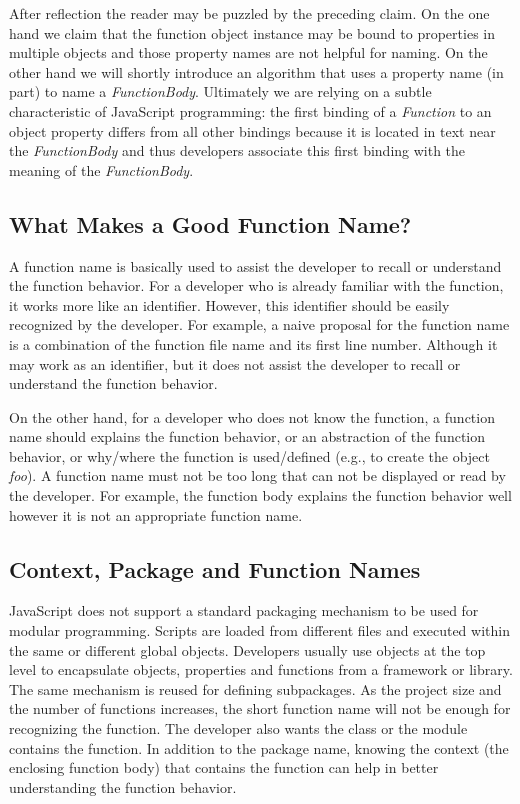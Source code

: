 \documentclass[10pt, preprint]{sigplanconf}
\begin{document}
After reflection the reader may be puzzled by the preceding claim. On the one hand we claim that the function object instance may be bound to properties in multiple objects and those property names are not helpful for naming. On the other hand we will shortly introduce an algorithm that uses a property name (in part) to name a {\textit{FunctionBody}}. Ultimately we are relying on a subtle characteristic of JavaScript programming: the first binding of a {\textit{Function}}  to an object property differs from all other bindings because it is located in text near the {\textit{FunctionBody}} and thus developers associate this first binding with the meaning of the {\textit{FunctionBody}}. 

\subsection{What Makes a Good Function Name?}
A function name is basically used to assist the developer to recall or understand the function behavior. For a developer who is already familiar with the function, it works more like an identifier. However, this identifier should be easily recognized by the developer. For example, a naive proposal for the function name is a combination of the function file name and its first line number. Although it may work as an identifier, but it does not assist the developer to recall or understand the function behavior.

 On the other hand, for a developer who does not know the function, a function name should explains the function behavior, or an abstraction of the function behavior, or why/where the function is used/defined (e.g., to create the object \textit{foo}). A function name must not be too long that can not be displayed or read by the developer. For example, the function body explains the function behavior well however it is not an appropriate function name.

\subsection{Context, Package and Function Names}
JavaScript does not support a standard packaging mechanism to be used for modular programming. Scripts are loaded from different files and executed within the same or different global objects. Developers usually use objects at the top level to encapsulate objects, properties and functions from a framework or library. The same mechanism is reused for defining subpackages. As the project size and the number of functions increases, the short function name will not be enough for recognizing the function. The developer also wants the class or the module contains the function. In addition to the package name, knowing the context (the enclosing function body) that contains the function can help in better understanding the function behavior.
\end{document}
